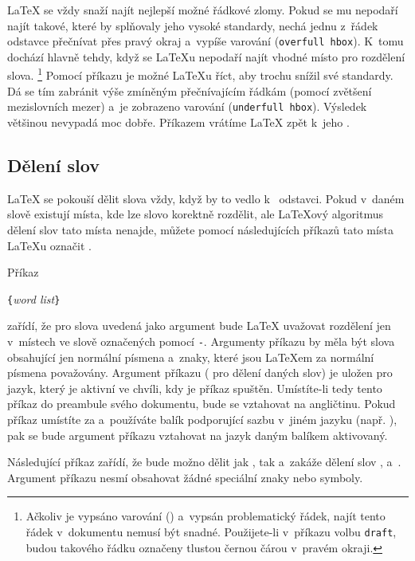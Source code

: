 \LaTeX{} se vždy snaží najít nejlepší možné řádkové zlomy. Pokud se
mu nepodaří najít takové, které by splňovaly jeho vysoké standardy,
nechá jednu z~řádek odstavce přečnívat přes pravý okraj a~vypíše varování
(\texttt{overfull hbox}). K~tomu dochází hlavně tehdy, když
se \LaTeX u nepodaří najít vhodné místo pro rozdělení slova.%
\footnote{Ačkoliv je vypsáno varování () a~vypsán
problematický řádek, najít tento řádek v~dokumentu nemusí být snadné.
Použijete-li v~příkazu  volbu \texttt{draft}, budou
takového řádku označeny tlustou černou čárou v~pravém okraji.} Pomocí
příkazu  je možné \LaTeX u říct, aby trochu snížil své
standardy. Dá se tím zabránit výše zmíněným přečnívajícím řádkám
(pomocí zvětšení mezislovních mezer) a~je zobrazeno varování
(\texttt{underfull hbox}).
Výsledek většinou nevypadá moc dobře.
Příkazem  vrátíme \LaTeX{} zpět k~jeho .

\subsection{Dělení slov} \label{hyph}

\LaTeX{} se pokouší dělit slova vždy, když by to vedlo k~ odstavci. Pokud v~daném slově existují místa, kde lze
slovo korektně rozdělit, ale \LaTeX ový algoritmus dělení slov tato
místa nenajde, můžete pomocí následujících příkazů tato místa
\LaTeX u označit .

Příkaz 
\begin{lscommand}
\verb|{|\emph{word list}\verb|}|
\end{lscommand}
\noindent zařídí, že pro slova uvedená jako argument bude \LaTeX{}
uvažovat rozdělení jen v~místech ve slově označených pomocí \verb|-|.
Argumenty příkazu by měla být slova obsahující jen normální písmena
a~znaky, které jsou \LaTeX em za normální písmena považovány. Argument
příkazu ( pro dělení daných slov) je uložen pro jazyk, který
je aktivní ve chvíli, kdy je příkaz spuštěn. Umístíte-li tedy tento
příkaz do preambule svého dokumentu, bude se vztahovat na angličtinu.
Pokud příkaz umístíte za \verb|| a~používáte balík
podporující sazbu v~jiném jazyku (např. ), pak se bude
argument příkazu  vztahovat na jazyk daným balíkem
aktivovaný.

Následující příkaz zařídí, že bude možno dělit jak ,
tak  a~zakáže dělení slov , 
a~. Argument příkazu  nesmí obsahovat 
žádné speciální znaky nebo symboly.

